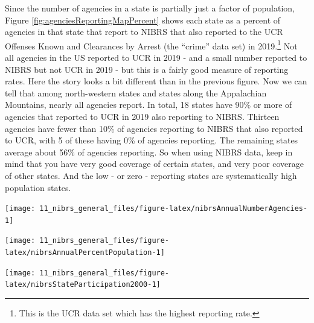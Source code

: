 \documentclass[
]{krantz}
\let\origfigure\figure
\let\endorigfigure\endfigure
\renewenvironment{figure}[1][2] {
    \expandafter\origfigure\expandafter[H]
} {
    \endorigfigure
}
\begin{document}
Since the number of agencies in a state is partially just a
factor of population, Figure
\ref{fig:agenciesReportingMapPercent} shows each state as a
percent of agencies in that state that report to NIBRS that
also reported to the UCR Offenses Known and Clearances by
Arrest (the ``crime'' data set) in 2019.\footnote{This is the
  UCR data set which has the highest reporting rate.} Not all
agencies in the US reported to UCR in 2019 - and a small
number reported to NIBRS but not UCR in 2019 - but this is a
fairly good measure of reporting rates. Here the story looks
a bit different than in the previous figure. Now we can tell
that among north-western states and states along the
Appalachian Mountains, nearly all agencies report. In total,
18 states have 90\% or more of agencies that reported to UCR
in 2019 also reporting to NIBRS. Thirteen agencies have
fewer than 10\% of agencies reporting to NIBRS that also
reported to UCR, with 5 of these having 0\% of agencies
reporting. The remaining states average about 56\% of
agencies reporting. So when using NIBRS data, keep in mind
that you have very good coverage of certain states, and very
poor coverage of other states. And the low - or zero -
reporting states are systematically high population states.

\begin{figure}

{\centering \texttt{[image: 11\_nibrs\_general\_files/figure-latex/nibrsAnnualNumberAgencies-1]} 

}

\caption{The annual number of police agencies that report data to NIBRS.}\label{fig:nibrsAnnualNumberAgencies}
\end{figure}

\begin{figure}

{\centering \texttt{[image: 11\_nibrs\_general\_files/figure-latex/nibrsAnnualPercentPopulation-1]} 

}

\caption{The annual percent of the United States population that is covered by an agency reporting data to NIBRS.}\label{fig:nibrsAnnualPercentPopulation}
\end{figure}

\begin{figure}

{\centering \texttt{[image: 11\_nibrs\_general\_files/figure-latex/nibrsStateParticipation2000-1]} 

}

\caption{The percent of each state's population that is covered by police agencies reporting at least one month of data to NIBRS, 2000}\label{fig:nibrsStateParticipation2000}
\end{figure}
\end{document}
